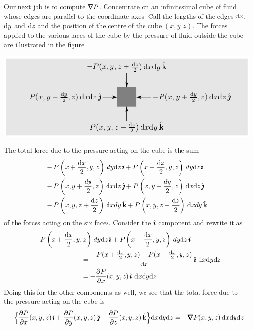 Our next job is to compute $\vnabla P$. Concentrate on an infinitesimal
cube of fluid whose edges are parallel to the coordinate axes. Call the 
lengths of the edges $\mathrm{d}x$, $\mathrm{d}y$ and $\mathrm{d}z$ and the position 
of the centre of the cube $(x,y,z)$. The forces applied to the various 
faces of the cube by the pressure of fluid outside the cube are 
illustrated in the figure
\begin{efig}
\begin{center}
    \includegraphics{fluidcube.pdf}
\end{center}
\end{efig}
The total force due to the pressure acting on the cube
is the sum 
\begin{align*}
&-P\left(x+\frac{\mathrm{d}x}{2},y,z\right)\,dy\mathrm{d}z\,\hat{\pmb{\imath}}
+P\left(x-\frac{\mathrm{d}x}{2},y,z\right)\,dy\mathrm{d}z\,\hat{\pmb{\imath}}\\
&-P\left(x,y+\frac{dy}{2},z\right)\,\mathrm{d}x\mathrm{d}z\,\hat{\pmb{\jmath}}
+P\left(x,y-\frac{dy}{2},z\right)\,\mathrm{d}x\mathrm{d}z\,\hat{\pmb{\jmath}}\\
&-P\left(x,y,z+\frac{\mathrm{d}z}{2}\right)\,\mathrm{d}xdy\,\hat{\mathbf{k}}
+P\left(x,y,z-\frac{\mathrm{d}z}{2}\right)\,\mathrm{d}xdy\,\hat{\mathbf{k}}
\end{align*}
of the forces acting on the six faces.
Consider the $\hat{\pmb{\imath}}$ component and rewrite it as
\begin{align*}
&-P\left(x+\frac{\dee{x}}{2},y,z\right)\,dy\dee{z}\,\hi
+P\left(x-\frac{\dee{x}}{2},y,z\right)\,dy\dee{z}\,\hi \\
&\hskip1in
=-\frac{P(x+{\dee{x}\over2},y,z)-P(x-{\dee{x}\over2},y,z)}{\dee{x}}\,\hi\ 
     \dee{x} \dee{y} \dee{z} \\
&\hskip1in
= - \frac{\partial P}{\partial x}(x,y,z)\,\hi\ 
     \dee{x} \dee{y} \dee{z}
\end{align*}
Doing this for the other components as well,
we see that the total force due to the pressure acting on the cube is
\begin{align*}
-\Big\{\frac{\partial P}{\partial x}(x,y,z)\,\hi
+\frac{\partial P}{\partial y}(x,y,z)\,\hj
+\frac{\partial P}{\partial z}(x,y,z)\,\hk
\Big\}\dee{x} \dee{y} \dee{z}
=-\vnabla P(x,y,z)\, \dee{x} \dee{y} \dee{z}
\end{align*}
